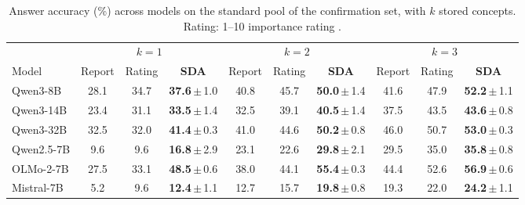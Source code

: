 \begin{table}[t]
\centering
\caption{Answer accuracy (\%) across models on the standard pool of the confirmation set, with $k$ stored concepts. Rating: 1--10
importance rating \citep{park2023generative}.}
\label{tab:sdabudget}
\small
\setlength{\tabcolsep}{4pt}
\begin{tabular}{lccccccccc}
\toprule
 & \multicolumn{3}{c}{$k{=}1$} & \multicolumn{3}{c}{$k{=}2$} & \multicolumn{3}{c}{$k{=}3$} \\
\cmidrule(lr){2-4} \cmidrule(lr){5-7} \cmidrule(lr){8-10}
Model & Report & Rating & \textbf{SDA} & Report & Rating & \textbf{SDA} & Report & Rating & \textbf{SDA} \\
\midrule
Qwen3-8B & 28.1 & 34.7 & \textbf{37.6}\,$\pm$\,1.0 & 40.8 & 45.7 & \textbf{50.0}\,$\pm$\,1.4 & 41.6 & 47.9 & \textbf{52.2}\,$\pm$\,1.1 \\
Qwen3-14B & 23.4 & 31.1 & \textbf{33.5}\,$\pm$\,1.4 & 32.5 & 39.1 & \textbf{40.5}\,$\pm$\,1.4 & 37.5 & 43.5 & \textbf{43.6}\,$\pm$\,0.8 \\
Qwen3-32B & 32.5 & 32.0 & \textbf{41.4}\,$\pm$\,0.3 & 41.0 & 44.6 & \textbf{50.2}\,$\pm$\,0.8 & 46.0 & 50.7 & \textbf{53.0}\,$\pm$\,0.3 \\
Qwen2.5-7B & 9.6 & 9.6 & \textbf{16.8}\,$\pm$\,2.9 & 23.1 & 22.6 & \textbf{29.8}\,$\pm$\,2.1 & 29.5 & 35.0 & \textbf{35.8}\,$\pm$\,0.8 \\
OLMo-2-7B & 27.5 & 33.1 & \textbf{48.5}\,$\pm$\,0.6 & 38.0 & 44.1 & \textbf{55.4}\,$\pm$\,0.3 & 44.4 & 52.6 & \textbf{56.9}\,$\pm$\,0.6 \\
Mistral-7B & 5.2 & 9.6 & \textbf{12.4}\,$\pm$\,1.1 & 12.7 & 15.7 & \textbf{19.8}\,$\pm$\,0.8 & 19.3 & 22.0 & \textbf{24.2}\,$\pm$\,1.1 \\
\bottomrule
\end{tabular}
\end{table}
